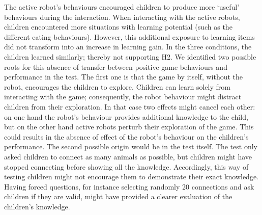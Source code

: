 The active robot's behaviours encouraged children to produce more `useful' behaviours during the interaction. When interacting with the active robots, children encountered more situations with learning potential (such as the different eating behaviours). However, this additional exposure to learning items did not transform into an increase in learning gain. In the three conditions, the children learned similarly; thereby not supporting H2. We identified two possible roots for this absence of transfer between positive game behaviours and performance in the test. The first one is that the game by itself, without the robot, encourages the children to explore. Children can learn solely from interacting with the game; consequently, the robot behaviour might distract children from their exploration. In that case two effects might cancel each other: on one hand the robot's behaviour provides additional knowledge to the child, but on the other hand active robots perturb their exploration of the game. This could results in the absence of effect of the robot's behaviour on the children's performance. The second possible origin would be in the test itself. The test only asked children to connect as many animals as possible, but children might have stopped connecting before showing all the knowledge. Accordingly, this way of testing children might not encourage them to demonstrate their exact knowledge. Having forced questions, for instance selecting randomly 20 connections and ask children if they are valid, might have provided a clearer evaluation of the children's knowledge. 



